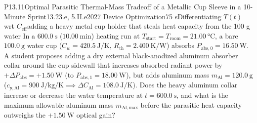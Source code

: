 \begin{problem}{P13.11}{Optimal Parasitic Thermal-Mass Tradeoff of a Metallic Cup Sleeve in a 10-Minute Sprint}{13.2}{3.e, 5.II.e}{2027 Device Optimization}{75 s}{Differentiating $T(t)$ wrt $C_{\mathrm{eff}}$}{adding a heavy metal cup holder that steals heat capacity from the 100 g water}
In a $\SI{600.0}{\second}$ ($\SI{10.00}{\minute}$) heating run at $T_{\mathrm{start}} = T_{\mathrm{room}} = \SI{21.00}{\celsius}$, a bare $\SI{100.0}{\gram}$ water cup ($C_w = \SI{420.5}{\joule\per\kelvin}$, $R_{\mathrm{th}} = \SI{2.400}{\kelvin\per\watt}$) absorbs $P_{\mathrm{abs},0} = \SI{16.50}{\watt}$. A student proposes adding a dry external black-anodized aluminum absorber collar around the cup sidewall that increases absorbed radiant power by $+\Delta P_{\mathrm{abs}} = +\SI{1.50}{\watt}$ (to $P_{\mathrm{abs},1} = \SI{18.00}{\watt}$), but adds aluminum mass $m_{\mathrm{Al}} = \SI{120.0}{\gram}$ ($c_{p,\mathrm{Al}} = \SI{900}{\joule\per\kilogram\per\kelvin} \implies \Delta C_{\mathrm{Al}} = \SI{108.0}{\joule\per\kelvin}$). Does the heavy aluminum collar increase or decrease the water temperature at $t = \SI{600.0}{\second}$, and what is the maximum allowable aluminum mass $m_{\mathrm{Al,max}}$ before the parasitic heat capacity outweighs the $+\SI{1.50}{\watt}$ optical gain?
\end{problem}
